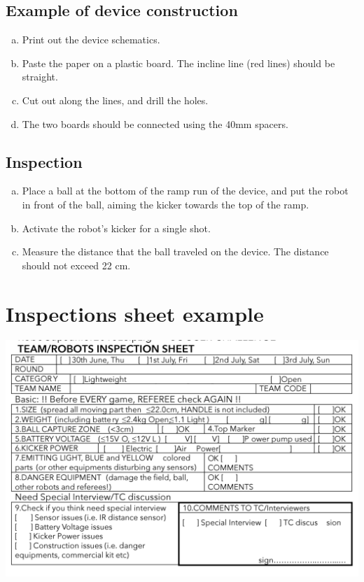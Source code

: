 \documentclass{article}
\begin{document}
\subsection{Example of device construction}

\begin{enumerate}[a.]
    \item Print out the device schematics.
    \item Paste the paper on a plastic board. The incline line (red lines) should be straight.
    \item Cut out along the lines, and drill the holes.
    \item The two boards should be connected using the 40mm spacers.
\end{enumerate}

\subsection{Inspection}

\begin{enumerate}[a.]
    \item Place a ball at the bottom of the ramp run of the
        device, and put the robot in front of the ball, aiming the kicker
        towards the top of the ramp.

    \item Activate the robot's kicker for a single shot.

    \item Measure the distance that the ball traveled on the device. The
        distance should not exceed 22 cm.

\end{enumerate}


\section{Inspections sheet example\label{ref-065}}

\includegraphics[width=1\textwidth]{media/image10.png}
\end{document}
